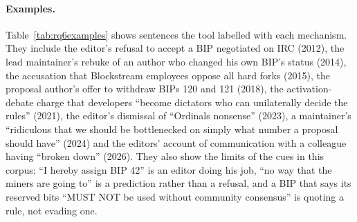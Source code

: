 \documentclass[sigconf,screen]{acmart}
\begin{document}
\paragraph{Examples.} Table~\ref{tab:rq6examples} shows sentences the tool labelled with each mechanism. They include the editor's refusal to accept a BIP negotiated on IRC (2012), the lead maintainer's rebuke of an author who changed his own BIP's status (2014), the accusation that Blockstream employees oppose all hard forks (2015), the proposal author's offer to withdraw BIPs 120 and 121 (2018), the activation-debate charge that developers ``become dictators who can unilaterally decide the rules'' (2021), the editor's dismissal of ``Ordinals nonsense'' (2023), a maintainer's ``ridiculous that we should be bottlenecked on simply what number a proposal should have'' (2024) and the editors' account of communication with a colleague having ``broken down'' (2026). They also show the limits of the cues in this corpus: ``I hereby assign BIP 42'' is an editor doing his job, ``no way that the miners are going to'' is a prediction rather than a refusal, and a BIP that says its reserved bits ``MUST NOT be used without community consensus'' is quoting a rule, not evading one.
\end{document}
